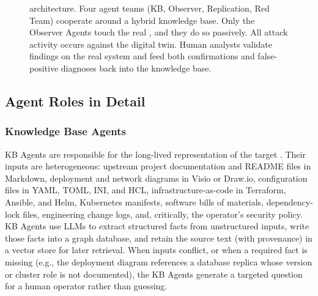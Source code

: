 \begin{figure}[t]
\caption{\sysname architecture. Four agent teams (KB, Observer,
Replication, Red Team) cooperate around a hybrid knowledge base. Only
the Observer Agents touch the real \cps, and they do so passively. All
attack activity occurs against the digital twin. Human analysts
validate findings on the real system and feed both confirmations and
false-positive diagnoses back into the knowledge base.}
\label{fig:arch}
\end{figure}

\subsection{Agent Roles in Detail}
\label{sec:approach-roles}

\subsubsection{Knowledge Base Agents}
KB Agents are responsible for the long-lived representation of the
target \cps. Their inputs are heterogeneous: upstream project
documentation and README files in Markdown, deployment and network
diagrams in Visio or Draw.io, configuration files in YAML, TOML, INI,
and HCL, infrastructure-as-code in Terraform, Ansible, and Helm,
Kubernetes manifests, software bills of materials, dependency-lock
files, engineering change logs, and, critically, the operator's
security policy. KB Agents use LLMs to extract structured facts from
unstructured inputs, write those facts into a graph database, and
retain the source text (with provenance) in a vector store for later
retrieval. When inputs conflict, or when a required fact is missing
(e.g., the deployment diagram references a database replica whose
version or cluster role is not documented), the KB Agents generate a
targeted question for a human operator rather than guessing.

